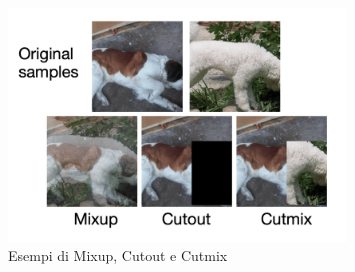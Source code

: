 \vspace{0.5cm}

\begin{figure}[ht]
    \centering
    \includegraphics[width=0.8\textwidth]{files/capitoli/3-data-augmentation/assets/mixup-cutout-cutmix.png}
    \caption{\label{fig:gan-augmentatione}Esempi di Mixup, Cutout e Cutmix\cite{38}}
\end{figure}

\newpage